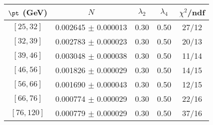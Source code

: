 \begin{tabular}{c||c|c|c|c}
$\pt$ (GeV) & $N$ & $\lambda_{2}$ & $\lambda_4$  & $\chi^2$/ndf  \\
\hline
$[25, 32]$ & 0.002645 $\pm$ 0.000013 & 0.30 & 0.50 & 27/12\\
$[32, 39]$ & 0.002783 $\pm$ 0.000023 & 0.30 & 0.50 & 20/13\\
$[39, 46]$ & 0.003048 $\pm$ 0.000038 & 0.30 & 0.50 & 11/14\\
$[46, 56]$ & 0.001826 $\pm$ 0.000029 & 0.30 & 0.50 & 14/15\\
$[56, 66]$ & 0.001690 $\pm$ 0.000043 & 0.30 & 0.50 & 12/15\\
$[66, 76]$ & 0.000774 $\pm$ 0.000029 & 0.30 & 0.50 & 22/16\\
$[76, 120]$ & 0.000779 $\pm$ 0.000029 & 0.30 & 0.50 & 37/16\\
\end{tabular}
